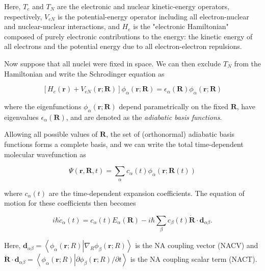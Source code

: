 \documentclass[12pt,letter,footinclude=true,headinclude=true,hyphens]{book} %
\begin{document}
    Here, $T_e$ and $T_N$ are the electronic and nuclear kinetic-energy operators, respectively, $V_{eN}$ is the potential-energy operator including all electron-nuclear and nuclear-nuclear interactions, and $H_e$ is the "electronic Hamiltonian" composed of purely electronic contributions to the energy: the kinetic energy of all electrons and the potential energy due to all electron-electron repulsions.
    
    Now suppose that all nuclei were fixed in space. We can then exclude $T_N$ from the Hamiltonian and write the Schrodinger equation as
    
    \begin{equation}
    \left[ H_e(\mathbf{r}) + V_{eN}(\mathbf{r}; \mathbf{R}) \right] \phi_{\alpha}(\mathbf{r}; \mathbf{R}) = \epsilon_{\alpha}(\mathbf{R})\phi_{\alpha}(\mathbf{r}; \mathbf{R})
    \end{equation}
    
    where the eigenfunctions $\phi_{\alpha}(\mathbf{r}; \mathbf{R})$ depend parametrically on the fixed $\mathbf{R}$, have eigenvalues $\epsilon_{\alpha}(\mathbf{R})$, and are denoted as the \textit{adiabatic basis functions}.
    
    Allowing all possible values of $\mathbf{R}$, the set of (orthonormal) adiabatic basis functions forms a complete basis, and we can write the total time-dependent molecular wavefunction as
    
    \begin{equation}
    \Psi(\mathbf{r}, \mathbf{R}, t) = \sum_{\alpha} c_{\alpha}(t) \phi_{\alpha}(\mathbf{r}; \mathbf{R}(t))
    \end{equation}
    
    where $c_{\alpha}(t)$ are the time-dependent expansion coefficients. The equation of motion for these coefficients then becomes
   
    \begin{equation}
    i \hbar \dot{c}_{\alpha}(t) = c_{\alpha}(t) E_{\alpha}(\mathbf{R}) - i \hbar \sum_{\beta} c_{\beta}(t) \dot{\mathbf{R}} \cdot \mathbf{d}_{\alpha \beta}.
    \end{equation}
    
    Here, $\mathbf{d}_{\alpha \beta} = \left < \phi_{\alpha}(\mathbf{r}; R) \left | \nabla_{R} \phi_{\beta}(\mathbf{r}; R) \right . \right >$ is the NA coupling vector (NACV) and $\dot{\mathbf{R}} \cdot \mathbf{d}_{\alpha \beta} = \left < \phi_{\alpha}(\mathbf{r}; R) \left | \partial \phi_{\beta}(\mathbf{r}; R) / \partial t \right . \right >$ is the NA coupling scalar term (NACT).
    
\end{document}
